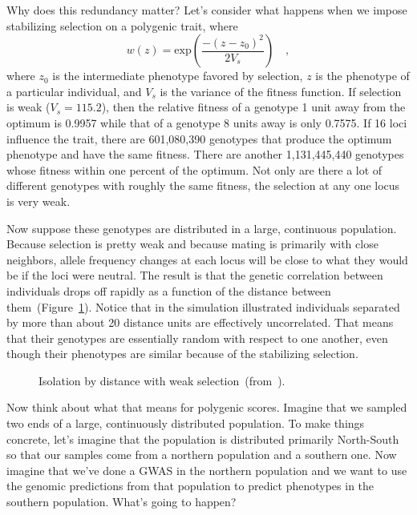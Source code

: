 \documentclass[12pt]{article}
\begin{document}
Why does this redundancy matter? Let's consider what happens when we
impose stabilizing selection on a polygenic trait, where
$$
w(z) = \mbox{exp}\left(\frac{-(z - z_0)^2}{2V_s}\right) \quad ,
$$
where $z_0$ is the intermediate phenotype favored by selection, $z$ is
the phenotype of a particular individual, and $V_s$ is the variance of
the fitness function. If selection is weak ($V_s = 115.2$), then the
relative fitness of a genotype 1 unit away from the optimum is 0.9957
while that of a genotype 8 units away is only 0.7575. If 16 loci
influence the trait, there are 601,080,390 genotypes that produce the
optimum phenotype and have the same fitness. There are another
1,131,445,440 genotypes whose fitness within one percent of the
optimum. Not only are there a lot of different genotypes with roughly
the same fitness, the selection at any one locus is very weak.

Now suppose these genotypes are distributed in a large, continuous
population. Because selection is pretty weak and because mating is
primarily with close neighbors, allele frequency changes at each locus
will be close to what they would be if the loci were neutral. The
result is that the genetic correlation between individuals drops off
rapidly as a function of the distance between
them~(Figure~\ref{fig:isolation-by-distance}). Notice that in the
simulation illustrated individuals separated by more than about 20
distance units are effectively uncorrelated. That means that their
genotypes are essentially random with respect to one another, even
though their phenotypes are similar because of the stabilizing
selection. 

\begin{figure}
\begin{center}
\end{center}
\caption{Isolation by distance with weak
  selection~(from~\cite{Goldstein-Holsinger-1992}).}\label{fig:isolation-by-distance}
\end{figure}

Now think about what that means for polygenic scores. Imagine that we
sampled two ends of a large, continuously distributed population. To
make things concrete, let's imagine that the population is distributed
primarily North-South so that our samples come from a northern
population and a southern one. Now imagine that we've done a GWAS in
the northern population and we want to use the genomic predictions
from that population to predict phenotypes in the southern
population. What's going to happen?
\end{document}
